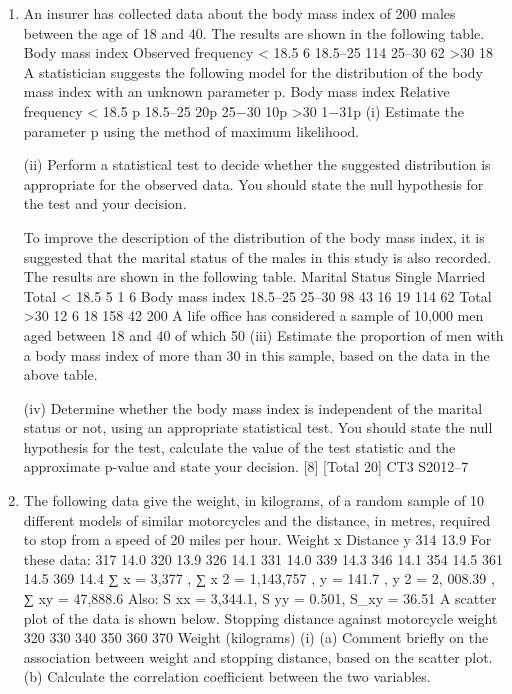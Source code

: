 \documentclass[a4paper,12pt]{article}
\begin{document}
\begin{enumerate}
\item An insurer has collected data about the body mass index of 200 males between the
age of 18 and 40. The results are shown in the following table.
Body mass index
Observed frequency
< 18.5
6
18.5–25
114
25–30
62
>30
18
A statistician suggests the following model for the distribution of the body mass index
with an unknown parameter p.
Body mass index
Relative frequency
< 18.5
p
18.5–25
20p
25−30
10p
>30
1−31p
(i) Estimate the parameter p using the method of maximum likelihood.

(ii) Perform a statistical test to decide whether the suggested distribution is
appropriate for the observed data. You should state the null hypothesis for the
test and your decision.

To improve the description of the distribution of the body mass index, it is suggested
that the marital status of the males in this study is also recorded. The results are
shown in the following table.
Marital Status
Single
Married
Total
< 18.5
5
1
6
Body mass index
18.5–25
25–30
98
43
16
19
114
62
Total
>30
12
6
18
158
42
200
A life office has considered a sample of 10,000 men aged between 18 and 40 of which
50%
(iii) Estimate the proportion of men with a body mass index of more than 30 in this
sample, based on the data in the above table.

(iv) Determine whether the body mass index is independent of the marital status or
not, using an appropriate statistical test. You should state the null hypothesis
for the test, calculate the value of the test statistic and the approximate
p-value and state your decision.
[8]
[Total 20]
CT3 S2012–7
\newpage
\item 
The following data give the weight, in kilograms, of a random sample of 10 different
models of similar motorcycles and the distance, in metres, required to stop from a
speed of 20 miles per hour.
Weight x
Distance y
314
13.9
For these data:
317
14.0
320
13.9
326
14.1
331
14.0
339
14.3
346
14.1
354
14.5
361
14.5
369
14.4
∑ x = 3,377 , ∑ x 2 = 1,143,757 , \sum y = 141.7 ,
\sum y 2 = 2, 008.39 , ∑ xy = 47,888.6
Also: S xx = 3,344.1, S yy = 0.501, S_{xy} = 36.51
A scatter plot of the data is shown below.
Stopping distance against motorcycle weight
320
330
340
350
360
370
Weight (kilograms)
(i)
(a) Comment briefly on the association between weight and stopping
distance, based on the scatter plot.
(b) Calculate the correlation coefficient between the two variables.


\end{enumerate}
\end{document}
